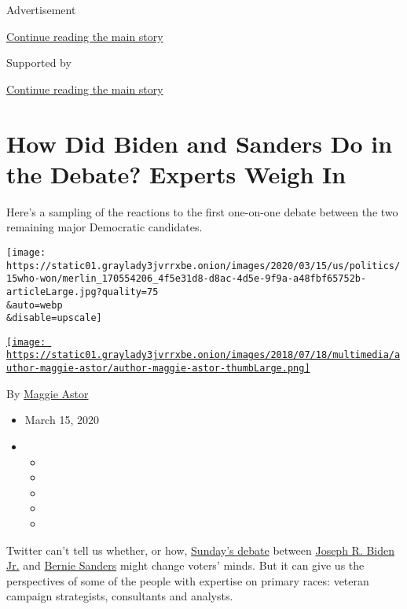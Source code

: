 Advertisement

\protect\hyperlink{after-top}{Continue reading the main story}

Supported by

\protect\hyperlink{after-sponsor}{Continue reading the main story}

\hypertarget{how-did-biden-and-sanders-do-in-the-debate-experts-weigh-in}{%
\section{How Did Biden and Sanders Do in the Debate? Experts Weigh
In}\label{how-did-biden-and-sanders-do-in-the-debate-experts-weigh-in}}

Here's a sampling of the reactions to the first one-on-one debate
between the two remaining major Democratic candidates.

\texttt{[image: https://static01.graylady3jvrrxbe.onion/images/2020/03/15/us/politics/15who-won/merlin\_170554206\_4f5e31d8-d8ac-4d5e-9f9a-a48fbf65752b-articleLarge.jpg?quality=75\\\&auto=webp\\\&disable=upscale]}

\href{https://www.nytimes3xbfgragh.onion/by/maggie-astor}{\texttt{[image: https://static01.graylady3jvrrxbe.onion/images/2018/07/18/multimedia/author-maggie-astor/author-maggie-astor-thumbLarge.png]}}

By \href{https://www.nytimes3xbfgragh.onion/by/maggie-astor}{Maggie
Astor}

\begin{itemize}
\item
  March 15, 2020
\item
  \begin{itemize}
  \item
  \item
  \item
  \item
  \item
  \end{itemize}
\end{itemize}

Twitter can't tell us whether, or how,
\href{https://www.nytimes3xbfgragh.onion/2020/03/15/us/politics/biden-sanders-debate-recap.html}{Sunday's
debate} between
\href{https://www.nytimes3xbfgragh.onion/interactive/2020/us/elections/joe-biden.html}{Joseph
R. Biden Jr.} and
\href{https://www.nytimes3xbfgragh.onion/interactive/2020/us/elections/bernie-sanders.html}{Bernie
Sanders} might change voters' minds. But it can give us the perspectives
of some of the people with expertise on primary races: veteran campaign
strategists, consultants and analysts.

